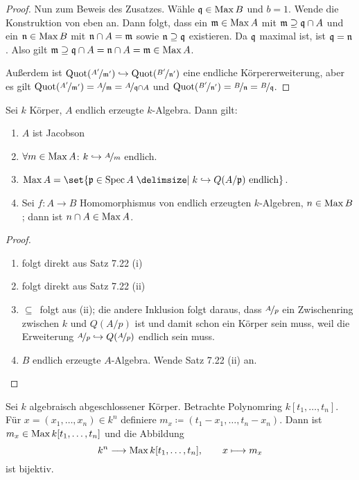 \documentclass[12pt,a4paper]{scrartcl}
\theoremstyle{cplain}
\theoremstyle{cdef}
\begin{document}
\begin{proof}

	Nun zum Beweis des Zusatzes. Wähle $\mathfrak{q}\in\operatorname{Max} B$ und $b = 1$. Wende die Konstruktion von eben an. Dann folgt, dass ein $\mathfrak{m}\in\operatorname{Max} A$ mit $\mathfrak{m}\supseteq \mathfrak{q}\cap A$ und ein $\mathfrak{n}\in \operatorname{Max} B$ mit $\mathfrak{n}\cap A = \mathfrak{m}$ sowie $\mathfrak{n}\supseteq \mathfrak{q}$ existieren. Da $\mathfrak{q}$ maximal ist, ist $\mathfrak{q} = \mathfrak{n}$. Also gilt $\mathfrak{m}\supseteq \mathfrak{q}\cap A = \mathfrak{n}\cap A = \mathfrak{m}\in\operatorname{Max} A$. 

	Außerdem ist $\operatorname{Quot}(\nicefrac{A'}{\mathfrak{m}'})\hookrightarrow \operatorname{Quot}(\nicefrac{B'}{\mathfrak{n}'})$ eine endliche Körpererweiterung, aber es gilt $\operatorname{Quot}(\nicefrac{A'}{\mathfrak{m}'}) = \nicefrac{A}{\mathfrak{m}} = \nicefrac{A}{\mathfrak{q}\cap A}$ und $\operatorname{Quot}(\nicefrac{B'}{\mathfrak{n}'}) = \nicefrac{B}{\mathfrak{n}} = \nicefrac{B}{\mathfrak{q}}$.
\end{proof}
\begin{kor}
	Sei $k$ Körper, $A$ endlich erzeugte $k$-Algebra. Dann gilt:
	\begin{enumerate}
		\item $A$ ist Jacobson
		\item $\forall m\in\operatorname{Max} A$: $k\hookrightarrow \nicefrac{A}{m}$ endlich.
		\item $\Max A = \set{\fp\in\Spec A\given k\hookrightarrow Q(A/\fp) \text{ endlich}}$. 
		\item Sei $f\colon A \to B$ Homomorphismus von endlich erzeugten $k$-Algebren, $n\in\operatorname{Max} B$; dann ist $n\cap A \in\operatorname{Max} A$.
	\end{enumerate}
\end{kor}
\begin{proof}
	\leavevmode
	\begin{enumerate}
		\item folgt direkt aus Satz 7.22 (i)
		\item folgt direkt aus Satz 7.22 (ii)
		\item \glqq $\subseteq$\grqq\ folgt aus (ii); die andere Inklusion folgt daraus, dass $\nicefrac{A}{p}$ ein Zwischenring zwischen $k$ und $Q(A/p)$ ist und damit schon ein Körper sein muss, weil die Erweiterung $\nicefrac{A}{p}\hookrightarrow Q(\nicefrac{A}{p})$ endlich sein muss.
		\item $B$ endlich erzeugte $A$-Algebra. Wende Satz 7.22 (ii) an.
	\end{enumerate}
\end{proof}
\begin{kor} Sei $k$ algebraisch abgeschlossener Körper. Betrachte Polynomring $k[t_1,\dots, t_n]$. Für $x = (x_1,\dots, x_n)\in k^n$ definiere $m_x \coloneqq (t_1-x_1,\dots, t_n-x_n)$. Dann ist $m_x\in \operatorname{Max} k[t_1,\dots, t_n]$ und die Abbildung
	$$k^n\longrightarrow \operatorname{Max} k[t_1,\dots, t_n],\qquad x\longmapsto m_x$$
ist bijektiv.
\end{kor}
\end{document}
